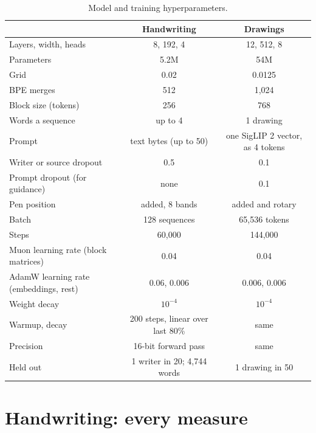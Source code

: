 \documentclass{article}
\begin{document}
\begin{table}[H]
\caption{Model and training hyperparameters.}
\label{tab:hypers}
\vskip 0.1in
\begin{center}
\begin{small}
\begin{tabular}{lcc}
\toprule
 & Handwriting & Drawings \\
\midrule
Layers, width, heads & 8, 192, 4 & 12, 512, 8 \\
Parameters & 5.2M & 54M \\
Grid & 0.02 & 0.0125 \\
BPE merges & 512 & 1,024 \\
Block size (tokens) & 256 & 768 \\
Words a sequence & up to 4 & 1 drawing \\
Prompt & text bytes (up to 50) & one SigLIP 2 vector, as 4 tokens \\
Writer or source dropout & 0.5 & 0.1 \\
Prompt dropout (for guidance) & none & 0.1 \\
Pen position & added, 8 bands & added and rotary \\
Batch & 128 sequences & 65,536 tokens \\
Steps & 60,000 & 144,000 \\
Muon learning rate (block matrices) & 0.04 & 0.04 \\
AdamW learning rate (embeddings, rest) & 0.06, 0.006 & 0.006, 0.006 \\
Weight decay & $10^{-4}$ & $10^{-4}$ \\
Warmup, decay & 200 steps, linear over last 80\% & same \\
Precision & 16-bit forward pass & same \\
Held out & 1 writer in 20; 4,744 words & 1 drawing in 50 \\
\bottomrule
\end{tabular}
\end{small}
\end{center}
\end{table}

\section{Handwriting: every measure}
\end{document}
